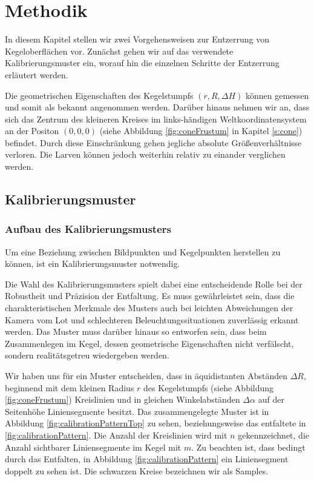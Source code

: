\chapter{Methodik}
\label{ch:method}
In diesem Kapitel stellen wir zwei Vorgehensweisen zur Entzerrung von Kegeloberflächen vor. 
Zunächst gehen wir auf das verwendete Kalibrierungsmuster ein, worauf hin die einzelnen Schritte der Entzerrung erläutert werden. 

Die geometrischen Eigenschaften des Kegelstumpfs $(r, R, \Delta H)$ können gemessen und somit als bekannt angenommen werden. 
Darüber hinaus nehmen wir an, dass sich das Zentrum des kleineren Kreises im links-händigen Weltkoordinatensystem an der Positon $(0,0,0)$ (siehe Abbildung \ref{fig:coneFrustum} in Kapitel \ref{s:cone}) befindet. Durch diese Einschränkung gehen jegliche absolute Größenverhältnisse verloren. Die Larven können jedoch weiterhin relativ zu einander verglichen werden. 


\section{Kalibrierungsmuster}
\label{s:calibrationPattern}
\subsection{Aufbau des Kalibrierungsmusters}
Um eine Beziehung zwischen Bildpunkten und Kegelpunkten herstellen zu können, ist ein Kalibrierungsmuster notwendig.

Die Wahl des Kalibrierungsmusters spielt dabei eine entscheidende Rolle bei der Robustheit und Präzision der Entfaltung. Es muss gewährleistet sein, dass die charakteristischen Merkmale des Musters auch bei leichten Abweichungen der Kamera vom Lot und schlechteren Beleuchtungssituationen zuverlässig erkannt werden. Das Muster muss darüber hinaus so entworfen sein, dass beim Zusammenlegen im Kegel, dessen geometrische Eigenschaften nicht verfälscht, sondern realitätsgetreu wiedergeben werden. 

Wir haben uns für ein Muster entscheiden, dass in äquidistanten Abständen $\Delta R$, beginnend mit dem kleinen Radius $r$ des Kegelstumpfs (siehe Abbildung \ref{fig:coneFrustum}) Kreislinien und in gleichen Winkelabständen $\Delta \alpha$ auf der Seitenhöhe Liniensegmente besitzt. Das zusammengelegte Muster ist in Abbildung \ref{fig:calibrationPatternTop} zu sehen, beziehungsweise das entfaltete in \ref{fig:calibrationPattern}. Die Anzahl der Kreislinien wird mit $n$ gekennzeichnet, die Anzahl sichtbarer Liniensegmente im Kegel mit $m$. Zu beachten ist, dass bedingt durch das Entfalten, in Abbildung \ref{fig:calibrationPattern}  ein Liniensegment doppelt zu sehen ist. Die schwarzen Kreise bezeichnen wir als Samples. 

